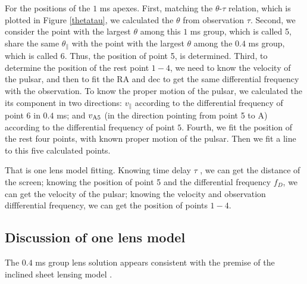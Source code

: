 \documentclass[useAMS,usenatbib]{mn2e}
\begin{document}
For the positions of the $1$ ms apexes. First, matching the $\theta$-$\tau$ relation, which is plotted in Figure \ref{thetatau}, we calculated the $\theta$ from observation $\tau$. Second, we consider the point with the largest $\theta$ among this $1$ ms group, which is called 5, share the same $\theta_{\parallel}$ with the point with the largest $\theta$ among the $0.4$ ms group, which is called 6. Thus, the position of point 5, is determined. Third, to determine the position of the rest point $1-4$, we need to know the velocity of the pulsar, and then to fit the RA and dec to get the same differential frequency with the observation. To know the proper motion of the pulsar, we calculated the its component in two directions: $v_{\parallel}$ according to the differential frequency of point $6$ in $0.4$ ms; and $v_{\rm A5}$ (in the direction pointing from point 5 to A) according to the differential frequency of point $5$. Fourth, we fit the position of the rest four points, with known proper motion of the pulsar. Then we fit a line to this five calculated points. 

That is one lens model fitting. Knowing time delay ${\tau}$ , we can get the distance of the screen; knowing the position of point 5 and the differential frequency ${f_D}$, we can get the velocity of the pulsar; knowing the velocity and observation diffferential frequency, we can get the position of points $1-4$.

\subsection{Discussion of one lens model}

The $0.4$ ms group lens solution appears consistent with the premise of the inclined
sheet lensing model \citep{2014MNRAS.442.3338P}.
\end{document}

